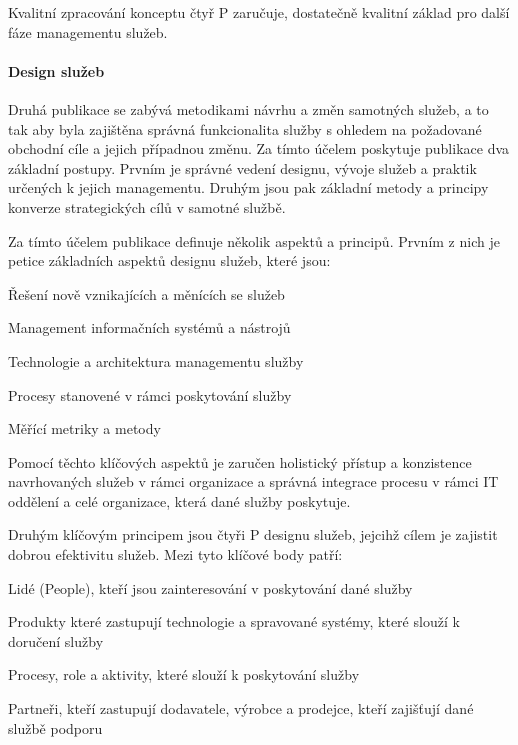 \documentclass[
  digital,     %
  twoside,     %
  lof,         %
  lot,         %
]{fithesis4}
\begin{document}
Kvalitní zpracování konceptu čtyř P zaručuje, dostatečně kvalitní základ pro další fáze managementu služeb.


\paragraph{Design služeb}
Druhá publikace se zabývá metodikami návrhu a změn samotných služeb, a to tak aby byla zajištěna správná funkcionalita služby s ohledem na požadované obchodní cíle a jejich případnou změnu. Za tímto účelem poskytuje publikace dva základní postupy. Prvním je správné vedení designu, vývoje služeb a praktik určených k jejich managementu. Druhým jsou pak základní metody a principy konverze strategických cílů v samotné službě.\parencite[s.~21]{Carlidge2007}

Za tímto účelem publikace definuje několik aspektů a principů. Prvním z nich je petice základních aspektů designu služeb, které jsou: \parencite[s.~22]{Carlidge2007}
\begin{compactitem}
    \item Řešení nově vznikajících a měnících se služeb
    \item Management informačních systémů a nástrojů
    \item Technologie a architektura managementu služby
    \item Procesy stanovené v rámci poskytování služby
    \item Měřící metriky a metody
\end{compactitem}
Pomocí těchto klíčových aspektů je zaručen holistický přístup a konzistence navrhovaných služeb v rámci organizace a správná integrace procesu v rámci IT oddělení a celé organizace, která dané služby poskytuje. \parencite[s.~22]{Carlidge2007}

Druhým klíčovým principem jsou čtyři P designu služeb, jejcihž cílem je zajistit dobrou efektivitu služeb. Mezi tyto klíčové body patří:\parencite[s.~22]{Carlidge2007}
\begin{compactitem}
    \item Lidé (People), kteří jsou zainteresování v poskytování dané služby
    \item Produkty které zastupují technologie a spravované systémy, které slouží k doručení služby
    \item Procesy, role a aktivity, které slouží k poskytování služby
    \item Partneři, kteří zastupují dodavatele, výrobce a prodejce, kteří zajišťují dané službě podporu
\end{compactitem}
\end{document}

